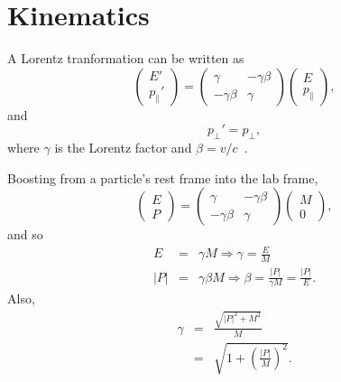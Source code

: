 \chapter{Kinematics}
\label{app:kinematics}
A Lorentz tranformation can be written as
\begin{equation}
\left(\begin{array}{c} E' \\ p_{\parallel}' \end{array} \right)
=
\left(
\begin{array}{cc}
\gamma & -\gamma\beta \\
-\gamma\beta & \gamma
\end{array}
\right)
\left (\begin{array}{c} E \\ p_{\parallel} \end{array}\right),
\end{equation}
and
\begin{equation}
p_{\perp}' = p_{\perp},
\end{equation}
where $\gamma$ is the Lorentz factor and $\beta=v/c$~\cite{pdg}.

Boosting from a particle's rest frame into the lab frame,
\begin{equation}
\left(\begin{array}{c} E \\ P \end{array} \right)
=
\left(
\begin{array}{cc}
\gamma & -\gamma\beta \\
-\gamma\beta & \gamma
\end{array}
\right)
\left (\begin{array}{c} M \\ 0 \end{array}\right),
\end{equation}
and so
\begin{eqnarray*}
E &=& \gamma M  \Longrightarrow \gamma = \frac{E}{M} \\
|P| &=& \gamma\beta M \Longrightarrow \beta = \frac{|P|}{\gamma M} = \frac{|P|}{E}.
\end{eqnarray*}
Also,
\begin{eqnarray*}
\gamma &=& \frac{\sqrt{|P|^2 + M^2}}{M} \\
&=& \sqrt{1 +\left(\frac{|P|}{M}\right)^2}.
\end{eqnarray*}
